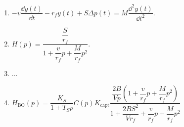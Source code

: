 \begin{enumerate}
\item $-v \dfrac{\dd y(t)}{\dd t} - r_f y(t) + S\Delta p(t) = M \dfrac{\dd^2 y(t)}{\dd t^2}$.
\item $H(p)=\dfrac{\dfrac{S}{r_f}}{1+\dfrac{v}{r_f}  p +  \dfrac{M}{r_f}  p^2 }$.
\item ...
\item $H_{\text{BO}}(p) = \dfrac{K_S}{1+T_S p}C(p) K_{\text{capt}} \dfrac{\dfrac{2B}{Vp}\left( 1+\dfrac{v}{r_f}  p +  \dfrac{M}{r_f}  p^2\right)}{1+\dfrac{2BS^2}{V r_f} + \dfrac{v}{r_f}  p +  \dfrac{M}{r_f}  p^2}$
\end{enumerate}

